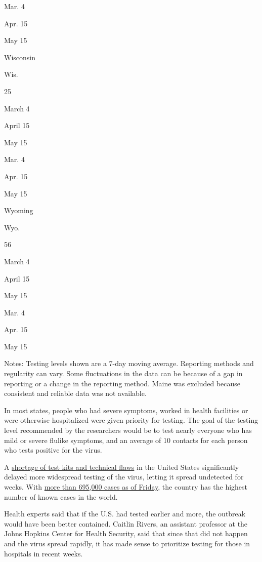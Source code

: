 Mar. 4

Apr. 15

May 15

Wisconsin

Wis.

25

March 4

April 15

May 15

Mar. 4

Apr. 15

May 15

Wyoming

Wyo.

56

March 4

April 15

May 15

Mar. 4

Apr. 15

May 15

Notes: Testing levels shown are a 7-day moving average. Reporting
methods and regularity can vary. Some fluctuations in the data can be
because of a gap in reporting or a change in the reporting method. Maine
was excluded because consistent and reliable data was not available.

In most states, people who had severe symptoms, worked in health
facilities or were otherwise hospitalized were given priority for
testing. The goal of the testing level recommended by the researchers
would be to test nearly everyone who has mild or severe flulike
symptoms, and an average of 10 contacts for each person who tests
positive for the virus.

A
\href{https://www.nytimes3xbfgragh.onion/2020/03/28/us/testing-coronavirus-pandemic.html}{shortage
of test kits and technical flaws} in the United States significantly
delayed more widespread testing of the virus, letting it spread
undetected for weeks. With
\href{https://www.nytimes3xbfgragh.onion/interactive/2020/us/coronavirus-us-cases.html}{more
than 695,000 cases as of Friday}, the country has the highest number of
known cases in the world.

Health experts said that if the U.S. had tested earlier and more, the
outbreak would have been better contained. Caitlin Rivers, an assistant
professor at the Johns Hopkins Center for Health Security, said that
since that did not happen and the virus spread rapidly, it has made
sense to prioritize testing for those in hospitals in recent weeks.

